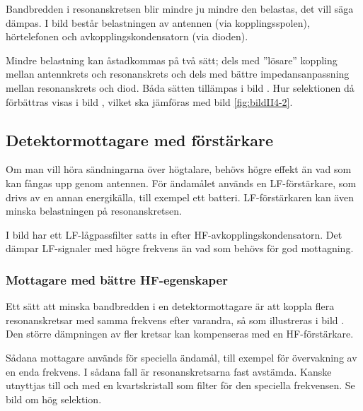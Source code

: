 Bandbredden i resonanskretsen blir mindre ju mindre den belastas,
det vill säga dämpas.
I bild  består belastningen av antennen (via
kopplingsspolen), hörtelefonen och avkopplingskondensatorn (via dioden).

Mindre belastning kan åstadkommas på två sätt; dels med ''lösare''
koppling mellan antennkrets och resonanskrets och dels med bättre
impedansanpassning mellan resonanskrets och diod.
Båda sätten tillämpas i bild .
Hur selektionen då förbättras visas i bild , vilket ska
jämföras med bild \ref{fig:bildII4-2}.



\subsection{Detektormottagare med förstärkare}

Om man vill höra sändningarna över högtalare, behövs högre effekt än
vad som kan fångas upp genom antennen.
För ändamålet används en LF-förstärkare, som drivs av en annan energikälla,
till exempel ett batteri.
LF-förstärkaren kan även minska belastningen på resonanskretsen.

I bild  har ett LF-lågpassfilter satts in efter
HF-avkopplingskondensatorn.
Det dämpar LF-signaler med högre frekvens än vad som behövs för god mottagning.

\subsubsection{Mottagare med bättre HF-egenskaper}
\label{mottagare_bättre_hf}

Ett sätt att minska bandbredden i en detektormottagare är att koppla
flera resonanskretsar med samma frekvens efter varandra, så som illustreras
i bild .
Den större dämpningen av fler kretsar kan kompenseras med en HF-förstärkare.

Sådana mottagare används för speciella ändamål, till exempel för övervakning
av en enda frekvens.
I sådana fall är resonanskretsarna fast avstämda.
Kanske utnyttjas till och med en kvartskristall som filter för den speciella
frekvensen.
Se bild  om hög selektion.

